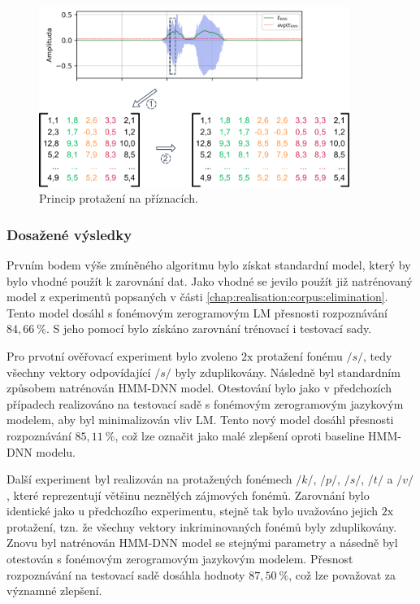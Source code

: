 \begin{figure}[hbpt]
  \centering
  \includegraphics[width=0.9\textwidth]{./ch5-construction/img/augmentation_features.pdf}
  \caption{Princip protažení na příznacích.}
  \label{fig:realisation:augmentation:features}
\end{figure}

\subsubsection{Dosažené výsledky}

Prvním bodem výše zmíněného algoritmu bylo získat standardní model, který by bylo vhodné použít k zarovnání dat.
Jako vhodné se jevilo použít již natrénovaný model z experimentů popsaných v části \ref{chap:realisation:corpus:elimination}.
Tento model dosáhl s fonémovým zerogramovým LM přesnosti rozpoznávání $84,66\ \%$.
S jeho pomocí bylo získáno zarovnání trénovací i testovací sady.

Pro prvotní ověřovací experiment bylo zvoleno $2\mathrm{x}$ protažení fonému $/s/$, tedy všechny vektory odpovídající $/s/$ byly zduplikovány.
Následně byl standardním způsobem natrénován HMM-DNN model.
Otestování bylo jako v předchozích případech realizováno na testovací sadě s fonémovým zerogramovým jazykovým modelem, aby byl minimalizován vliv LM.
Tento nový model dosáhl přesnosti rozpoznávání $85,11\ \%$, což lze označit jako malé zlepšení oproti baseline HMM-DNN modelu.

Další experiment byl realizován na protažených fonémech $/k/$, $/p/$, $/s/$, $/t/$ a $/v/$, které reprezentují většinu neznělých zájmových fonémů.
Zarovnání bylo identické jako u předchozího experimentu, stejně tak bylo uvažováno jejich $2\mathrm{x}$ protažení, tzn. že všechny vektory inkriminovaných fonémů byly zduplikovány.
Znovu byl natrénován HMM-DNN model se stejnými parametry a násedně byl otestován s fonémovým zerogramovým jazykovým modelem.
Přesnost rozpoznávání na testovací sadě dosáhla hodnoty $87,50\ \%$, což lze považovat za významné zlepšení.

